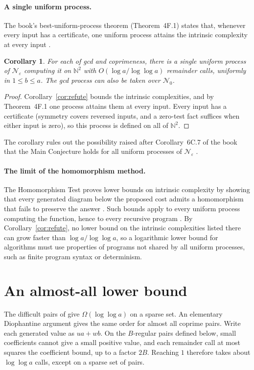 \documentclass[11pt]{article}
\newtheorem{corollary}[theorem]{Corollary}
\theoremstyle{remark}
\begin{document}
\paragraph{A single uniform process.}
The book's best-uniform-process theorem (Theorem~4F.1) states that,
whenever every input has a certificate,
one uniform process attains the intrinsic complexity at every input
\cite[pp.~149--150]{moschovakis2019}.

\begin{corollary}\label{cor:uniform}
For each of gcd and coprimeness, there is a single uniform process of
$\mathcal N_\varepsilon$ computing it on $\mathbb N^2$ with
$O(\log a/\log\log a)$ remainder calls, uniformly in $1\leq b\leq a$.
The gcd process can also be taken over $\mathcal N_0$.
\end{corollary}
\begin{proof}
Corollary~\ref{cor:refute} bounds the intrinsic complexities, and by
Theorem~4F.1 one process attains them at every input. Every input has a
certificate (symmetry covers reversed inputs, and a zero-test fact
suffices when either input is zero), so this process is defined on all of
$\mathbb N^2$.
\end{proof}
The corollary rules out the possibility raised after Corollary~6C.7 of the
book that the Main Conjecture holds for all uniform processes of
$\mathcal N_\varepsilon$ \cite[p.~188]{moschovakis2019}.

\paragraph{The limit of the homomorphism method.}\label{par:method}
The Homomorphism Test proves lower bounds on intrinsic complexity by
showing that every generated diagram below the proposed cost admits a
homomorphism that fails to preserve the answer
\cite[Lemma~4E.3]{moschovakis2019}. Such bounds apply to every uniform
process computing the function, hence to every recursive program
\cite[Proposition~4E.1, Corollary~4E.2]{moschovakis2019}.
By Corollary~\ref{cor:refute}, no lower bound on the intrinsic complexities
listed there can grow faster than $\log a/\log\log a$, so a logarithmic lower bound
for algorithms must use properties of programs not shared by all uniform
processes, such as finite program
syntax or determinism.

\section{An almost-all lower bound}\label{sec:loglog}
The difficult pairs of \cite[Theorem~6C.5]{moschovakis2019} give
$\Omega(\log\log a)$ on a sparse set. An elementary Diophantine argument gives
the same order for almost all coprime pairs. Write each generated value as
$ua+wb$. On the $B$-regular pairs defined below, small coefficients cannot give
a small positive value, and each remainder call at most squares the
coefficient bound, up to a factor $2B$. Reaching $1$ therefore takes about
$\log\log a$ calls, except on a sparse set of pairs.
\end{document}
